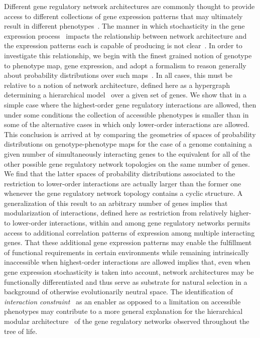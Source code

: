 Different gene regulatory network architectures are commonly thought to provide access to different collections of gene expression patterns that may ultimately result in different phenotypes~\cite{Alon2007}. The manner in which stochasticity in the gene expression process~\cite{Eldar2010,Sanchez2013} impacts the relationship between network architecture and the expression patterns each is capable of producing is not clear~\cite{Jothi2009,Chalancon2012}. In order to investigate this relationship, we begin with the finest grained notion of genotype to phenotype map, gene expression, and adopt a formalism to reason generally about probability distributions over such maps~\cite{Lane1998,MacLane1992,Awodey2006,Abramsky2011}. In all cases, this must be relative to a notion of network architecture, defined here as a hypergraph determining a hierarchical model~\cite{Lauritzen1996} over a given set of genes. We show that in a simple case where the highest-order gene regulatory interactions are allowed, then under some conditions the collection of accessible phenotypes is smaller than in some of the alternative cases in which only lower-order interactions are allowed. This conclusion is arrived at by comparing the geometries of spaces of probability distributions on genotype-phenotype maps for the case of a genome containing a given number of simultaneously interacting genes to the equivalent for all of the other possible gene regulatory network topologies on the same number of genes. We find that the latter spaces of probability distributions associated to the restriction to lower-order interactions are actually larger than the former one whenever the gene regulatory network topology contains a cyclic structure. A generalization of this result to an arbitrary number of genes implies that modularization of interactions, defined here as restriction from relatively higher- to lower-order interactions, within and among gene regulatory networks permits access to additional correlation patterns of expression among multiple interacting genes. That these additional gene expression patterns may enable the fulfillment of functional requirements in certain environments while remaining intrinsically inaccessible when highest-order interactions are allowed implies that, even when gene expression stochasticity is taken into account, network architectures may be functionally differentiated and thus serve as substrate for natural selection in a background of otherwise evolutionarily neutral space. The identification of \emph{interaction constraint}~\cite{Bar-Even2006,Johnson2010a} as an enabler as opposed to a limitation on accessible phenotypes may contribute to a more general explanation for the hierarchical modular architecture~\cite{Ravasz2002,Segre2005,Wagner2007,Erwin2009,Jothi2009,Bhardwaj2010,Colm} of the gene regulatory networks observed throughout the tree of life.
